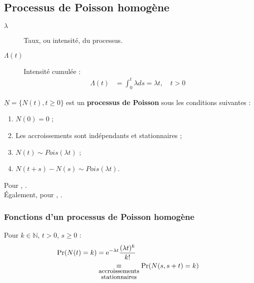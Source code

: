 \documentclass[10pt, french]{article}
\begin{document}
\begin{multicols*}{2}
\columnbreak
\subsection{Processus de Poisson homogène}
\begin{distributions}[Notation]
\begin{description}
	\item[$\lambda$]	Taux, ou intensité, du processus.
	\item[$\Lambda(t)$]	Intensité cumulée :
		\begin{align*}
		\Lambda(t)
		&=	\int_{0}^{t} \lambda ds
		=	\lambda t, \quad t > 0
		\end{align*}
\end{description}
\end{distributions}

\begin{definitionNOHFILLsub}
$\underline{N}	=	\{N(t), t \geq 0\}$ est un \textbf{processus de Poisson} sous les conditions suivantes :
\begin{enumerate}
	\item	$N(0)	=	0$ ;
	\item	Les accroissements sont indépendants et stationnaires ;
	\item	$N(t)	\sim	Pois(\lambda t)$ ;
	\item	$N(t + s) - N(s) \sim Pois(\lambda t)$.
\end{enumerate}
\end{definitionNOHFILLsub}

Pour , \lfbox[formula]{$N(s, s + t]	=	N(s + t)	-	N(s)$}.\\
Également, pour , \lfbox[formula]{$\Lambda(s, s + t]	=	\Lambda(s + t)	-	\Lambda(s)$}.

\subsubsection*{Fonctions d'un processus de Poisson homogène}
Pour $k \in \mathbb{N}$, $t > 0$, $s \geq 0$ :
\begin{align*}
	\Pr(N(t)	=	k)
	&=	\textrm{e}^{-\lambda t} \frac{(\lambda t)^{k}}{k!}	\\
	&\underset{\small\shortstack{accroissements\\ stationnaires}}{\equiv} \Pr(N(s, s + t)	=	k)
\end{align*}



\end{multicols*}
\end{document}
